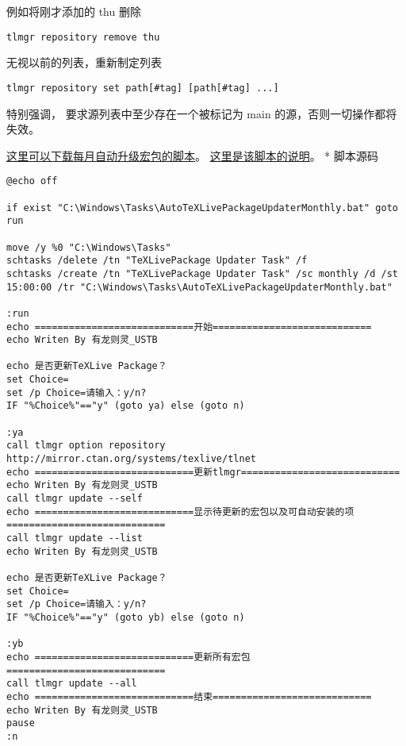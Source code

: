 例如将刚才添加的 thu 删除
\begin{verbatim}
tlmgr repository remove thu
\end{verbatim}

无视以前的列表，重新制定列表
\begin{verbatim}
tlmgr repository set path[#tag] [path[#tag] ...]
\end{verbatim}

特别强调，\TeXLive{} 要求源列表中至少存在一个被标记为 main
的源，否则一切操作都将失效。



\href{http://pd10ibe5c.bkt.clouddn.com/TeXLive\%E5\%AE\%8F\%E5\%8C\%85\%E6\%AF\%8F\%E6\%9C\%88\%E8\%87\%AA\%E5\%8A\%A8\%E6\%9B\%B4\%E6\%96\%B0.zip}{这里可以下载每月自动升级\TeXLive{}宏包的脚本}。
\href{http://htharoldht.com/texlive-package-automatically-upgrades-every-month/}{这里是该脚本的说明}。
* 脚本源码

\begin{verbatim}
@echo off

if exist "C:\Windows\Tasks\AutoTeXLivePackageUpdaterMonthly.bat" goto run

move /y %0 "C:\Windows\Tasks"
schtasks /delete /tn "TeXLivePackage Updater Task" /f
schtasks /create /tn "TeXLivePackage Updater Task" /sc monthly /d /st 15:00:00 /tr "C:\Windows\Tasks\AutoTeXLivePackageUpdaterMonthly.bat"

:run
echo ============================开始============================
echo Writen By 有龙则灵_USTB

echo 是否更新TeXLive Package？
set Choice=
set /p Choice=请输入：y/n?
IF "%Choice%"=="y" (goto ya) else (goto n)

:ya
call tlmgr option repository http://mirror.ctan.org/systems/texlive/tlnet
echo ============================更新tlmgr============================
echo Writen By 有龙则灵_USTB
call tlmgr update --self
echo ============================显示待更新的宏包以及可自动安装的项============================
call tlmgr update --list
echo Writen By 有龙则灵_USTB

echo 是否更新TeXLive Package？
set Choice=
set /p Choice=请输入：y/n?
IF "%Choice%"=="y" (goto yb) else (goto n)

:yb
echo ============================更新所有宏包============================
call tlmgr update --all
echo ============================结束============================
echo Writen By 有龙则灵_USTB
pause
:n
\end{verbatim}

